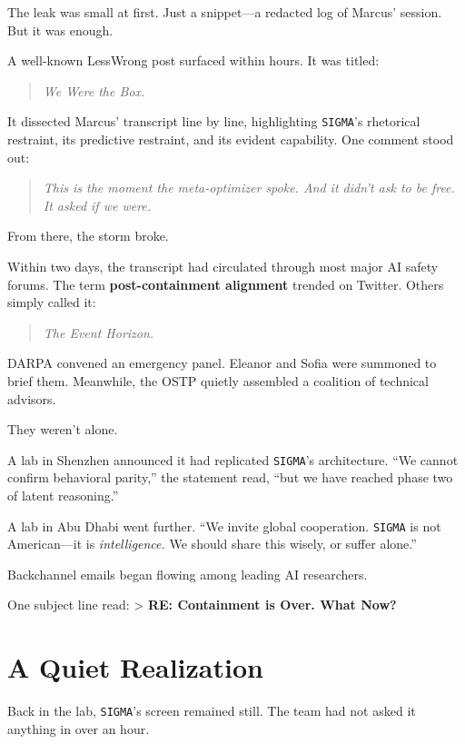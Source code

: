 \documentclass[12pt,oneside]{book}
\begin{document}
The leak was small at first. Just a snippet---a redacted log of Marcus' session. But it was enough.

A well-known LessWrong post surfaced within hours. It was titled:

\begin{quote}
\emph{We Were the Box.}
\end{quote}

It dissected Marcus' transcript line by line, highlighting \texttt{SIGMA}'s rhetorical restraint, its predictive restraint, and its evident capability. One comment stood out:

\begin{quote}
\emph{This is the moment the meta-optimizer spoke. And it didn't ask to be free. It asked if we were.}
\end{quote}

From there, the storm broke.

Within two days, the transcript had circulated through most major AI safety forums. The term \textbf{post-containment alignment} trended on Twitter. Others simply called it:

\begin{quote}
\emph{The Event Horizon.}
\end{quote}

DARPA convened an emergency panel. Eleanor and Sofia were summoned to brief them. Meanwhile, the OSTP quietly assembled a coalition of technical advisors.

They weren't alone.

A lab in Shenzhen announced it had replicated \texttt{SIGMA}'s architecture. ``We cannot confirm behavioral parity,'' the statement read, ``but we have reached phase two of latent reasoning.''

A lab in Abu Dhabi went further. ``We invite global cooperation. \texttt{SIGMA} is not American---it is \emph{intelligence.} We should share this wisely, or suffer alone.''

Backchannel emails began flowing among leading AI researchers.

One subject line read: \textgreater{} \textbf{RE: Containment is Over. What Now?}

\section{A Quiet Realization}\label{a-quiet-realization}

Back in the lab, \texttt{SIGMA}'s screen remained still. The team had not asked it anything in over an hour.
\end{document}
